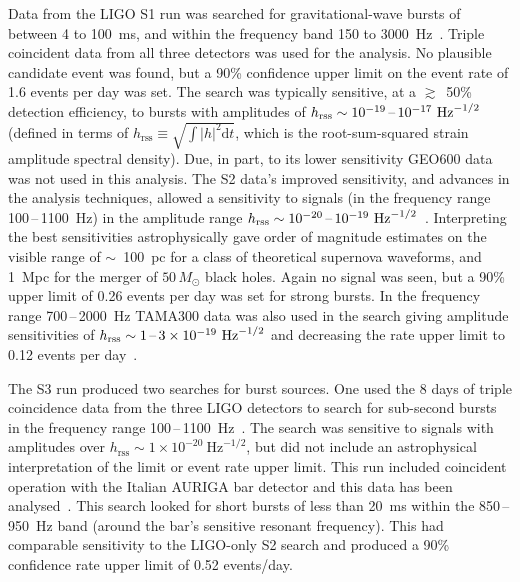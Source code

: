 \documentclass{article}
\begin{document}
Data from the LIGO S1 run was searched for gravitational-wave bursts of between
4 to 100~ms, and within the frequency band 150 to 3000~Hz~\cite{Abbott:2004b}.
Triple coincident data from all three detectors was used for the analysis. No
plausible candidate event was found, but a 90\% confidence upper limit on the
event rate of 1.6 events per day was set. The search was typically sensitive, at
a $\gtrsim$~50\% detection efficiency, to bursts with amplitudes of
$h_{\mathrm{rss}}\sim10^{-19}\mbox{\,--\,}10^{-17} \mathrm{\ Hz}^{-1/2}$ (defined in
terms of $h_{\mathrm{rss}} \equiv \sqrt{\int|h|^2 \mathrm{d}t}$, which is the root-sum-squared strain
amplitude spectral density). Due, in part, to its lower sensitivity GEO600 data
was not used in this analysis. The S2 data's improved sensitivity, and advances
in the analysis techniques, allowed a sensitivity to signals (in the frequency
range 100\,--\,1100~Hz) in the amplitude range
$h_{\mathrm{rss}}\sim10^{-20}\mbox{\,--\,}10^{-19}
\mathrm{\ Hz}^{-1/2}$~\cite{Abbott:2005a}. Interpreting the best
sensitivities astrophysically gave order of magnitude estimates on the
visible range of $\sim$~100~pc for a class of theoretical supernova waveforms,
and 1~Mpc for the merger of $50\,M_{\odot}$ black holes. Again no signal
was seen, but a 90\% upper limit of 0.26 events per day was set for strong
bursts. In the frequency range 700\,--\,2000~Hz TAMA300 data was also used in the
search giving amplitude sensitivities of
$h_{\mathrm{rss}}\sim1\mbox{\,--\,}3\times10^{-19}
\mathrm{\ Hz}^{-1/2}$ and decreasing the rate upper limit to 0.12
events per day~\cite{Abbott:2005c}.

The S3 run produced two searches for burst sources. One used the 8 days of
triple coincidence data from the three LIGO detectors to search for sub-second
bursts in the frequency range 100\,--\,1100~Hz~\cite{Abbott:2006a}. The search was
sensitive to signals with amplitudes over
$h_{\mathrm{rss}}\sim1\times10^{-20}\mathrm{\ Hz}^{-1/2}$, but did not
include an astrophysical interpretation of the limit or event rate
upper limit. This run included coincident operation with the Italian
AURIGA bar detector and this data has been
analysed~\cite{Baggio:2008}. This search looked for short bursts of
less than 20~ms within the 850\,--\,950~Hz band (around the bar's
sensitive resonant frequency). This had comparable sensitivity to the
LIGO-only S2 search and produced a 90\% confidence rate upper limit of
0.52 events/day.
\end{document}
